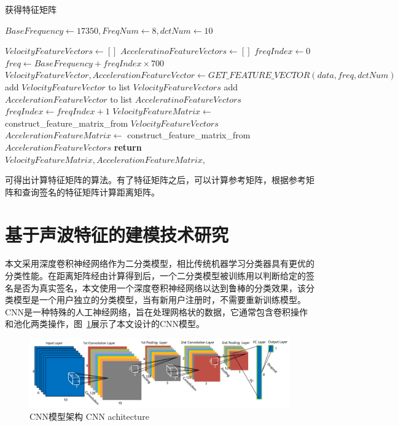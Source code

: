 \begin{algorithm}[!htp]
\caption{获得特征矩阵}
\label{alg:get-feature-matrix}
\begin{algorithmic}[1]
 
\State $BaseFrequency \gets 17350, FreqNum \gets 8, dctNum \gets 10$ 

\State $VelocityFeatureVectors \gets []$  
\State $AcceleratinoFeatureVectors \gets []$ 
\State $freqIndex \gets 0$ 
 
\State $freq \gets BaseFrequency + freqIndex\times 700$
\State $VelocityFeatureVector,AccelerationFeatureVector \gets  GET\_FEATURE\_VECTOR(data, freq, dctNum)$
\State add $VelocityFeatureVector$ to list $VelocityFeatureVectors$ 
\State add $AccelerationFeatureVector$ to list $AcceleratinoFeatureVectors$ 
\State $freqIndex \gets freqIndex + 1$
\EndWhile\label{euclidendwhile}
\State $VelocityFeatureMatrix \gets$ construct\_feature\_matrix\_from $VelocityFeatureVectors$ 
\State $AccelerationFeatureMatrix \gets$ construct\_feature\_matrix\_from $AccelerationFeatureVectors$ 
\State \textbf{return} $VelocityFeatureMatrix,AccelerationFeatureMatrix,$
\EndProcedure
\end{algorithmic}
\end{algorithm}
可得出计算特征矩阵的算法。有了特征矩阵之后，可以计算参考矩阵，根据参考矩阵和查询签名的特征矩阵计算距离矩阵。

\section{基于声波特征的建模技术研究}
本文采用深度卷积神经网络作为二分类模型，相比传统机器学习分类器具有更优的分类性能。在距离矩阵经由计算得到后，一个二分类模型被训练用以判断给定的签名是否为真实签名，本文使用一个深度卷积神经网络以达到鲁棒的分类效果，该分类模型是一个用户独立的分类模型，当有新用户注册时，不需要重新训练模型。CNN是一种特殊的人工神经网络，旨在处理网格状的数据，它通常包含卷积操作和池化两类操作，图~\ref{fig:cnn-architecture}展示了本文设计的CNN模型。
\begin{figure}[!htp]
  \centering
  \includegraphics[width=\textwidth]{figure/cnn-architecture.pdf}
  \bicaption
    {CNN模型架构}
    {CNN achitecture}
  \label{fig:cnn-architecture}
\end{figure}

